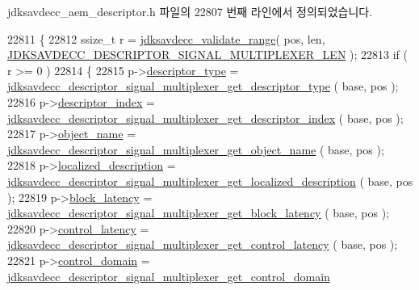 jdksavdecc\+\_\+aem\+\_\+descriptor.\+h 파일의 22807 번째 라인에서 정의되었습니다.


\begin{DoxyCode}
22811 \{
22812     ssize\_t r = \hyperlink{group__util_ga9c02bdfe76c69163647c3196db7a73a1}{jdksavdecc\_validate\_range}( pos, len, 
      \hyperlink{group__descriptor__signal__multiplexer_ga300d29c873c2da91e9cbdf1a73dd62f1}{JDKSAVDECC\_DESCRIPTOR\_SIGNAL\_MULTIPLEXER\_LEN} );
22813     \textcolor{keywordflow}{if} ( r >= 0 )
22814     \{
22815         p->\hyperlink{structjdksavdecc__descriptor__signal__multiplexer_ab7c32b6c7131c13d4ea3b7ee2f09b78d}{descriptor\_type} = 
      \hyperlink{group__descriptor__signal__multiplexer_ga0c13f523d4d52e809c05e094f584b548}{jdksavdecc\_descriptor\_signal\_multiplexer\_get\_descriptor\_type}
      ( base, pos );
22816         p->\hyperlink{structjdksavdecc__descriptor__signal__multiplexer_a042bbc76d835b82d27c1932431ee38d4}{descriptor\_index} = 
      \hyperlink{group__descriptor__signal__multiplexer_ga04e4ecc31acd2d444667139173a93fd4}{jdksavdecc\_descriptor\_signal\_multiplexer\_get\_descriptor\_index}
      ( base, pos );
22817         p->\hyperlink{structjdksavdecc__descriptor__signal__multiplexer_a7d1f5945a13863b1762fc6db74fa8f80}{object\_name} = 
      \hyperlink{group__descriptor__signal__multiplexer_gaed83802ef9894fd05eb11213b7d885a3}{jdksavdecc\_descriptor\_signal\_multiplexer\_get\_object\_name}
      ( base, pos );
22818         p->\hyperlink{structjdksavdecc__descriptor__signal__multiplexer_a0926f846ca65a83ad5bb06b4aff8f408}{localized\_description} = 
      \hyperlink{group__descriptor__signal__multiplexer_ga02b6ea6db82e485169a9bf1916699a04}{jdksavdecc\_descriptor\_signal\_multiplexer\_get\_localized\_description}
      ( base, pos );
22819         p->\hyperlink{structjdksavdecc__descriptor__signal__multiplexer_ae2e9f0088d5e900b610d1b2818dfc559}{block\_latency} = 
      \hyperlink{group__descriptor__signal__multiplexer_ga1d3e6b8e5534f24de8496594688fe571}{jdksavdecc\_descriptor\_signal\_multiplexer\_get\_block\_latency}
      ( base, pos );
22820         p->\hyperlink{structjdksavdecc__descriptor__signal__multiplexer_ab2bd4639caaf9a8078b68368afbd63b6}{control\_latency} = 
      \hyperlink{group__descriptor__signal__multiplexer_ga7a005849d3a05d873e60b97e9509aad4}{jdksavdecc\_descriptor\_signal\_multiplexer\_get\_control\_latency}
      ( base, pos );
22821         p->\hyperlink{structjdksavdecc__descriptor__signal__multiplexer_a8937b22996b7c28ae209f29fe777f03a}{control\_domain} = 
      \hyperlink{group__descriptor__signal__multiplexer_ga2faf0061023fc392ae4119564d489937}{jdksavdecc\_descriptor\_signal\_multiplexer\_get\_control\_domain}

\end{DoxyCode}
